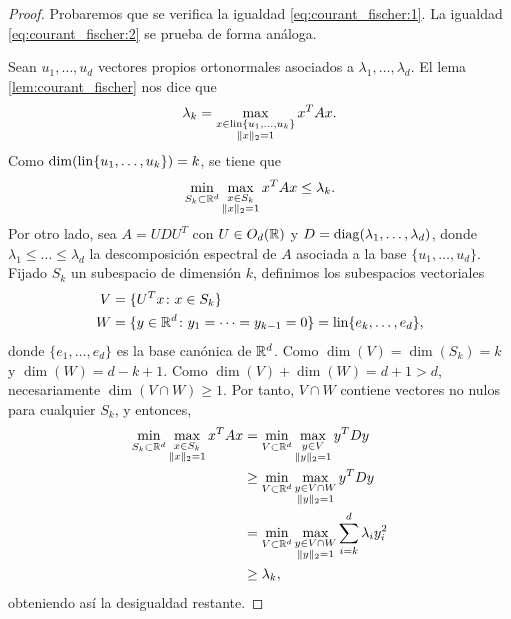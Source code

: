 \begin{proof}
    Probaremos que se verifica la igualdad \ref{eq:courant_fischer:1}. La igualdad \ref{eq:courant_fischer:2} se prueba de forma análoga.

    Sean  $u_1, \dots, u_d$ vectores propios ortonormales asociados a $\lambda_1,\dots,\lambda_d$. El lema \ref{lem:courant_fischer} nos dice que
    \[ \lambda_k = \max_{\substack{x \in \operatorname{lin}\{u_1,\dots,u_k\} \\ \|x\|_2 = 1}} x^TAx. \]
    Como $\dim(\operatorname{lin}\{u_1,\dots,u_k\}) = k$, se tiene que
    \[ \min_{S_k \subset \mathbb{R}^d} \max_{\substack{x \in S_k \\ \|x\|_2 = 1}} x^TAx \le \lambda_k. \]
    Por otro lado, sea $A = UDU^T$ con $U \in O_d(\mathbb{R})$ y $D = \operatorname{diag}(\lambda_1,\dots,\lambda_d)$, donde $\lambda_1 \le \dots \le \lambda_d$ la descomposición espectral de $A$ asociada a la base $\{u_1,\dots,u_d\}$.
    Fijado $S_k$ un subespacio de dimensión $k$, definimos los subespacios vectoriales
    \begin{align*}
        V &= \{ U^Tx \colon x \in S_k \} \\
        W &= \{ y \in \mathbb{R}^d \colon y_1 = \dots = y_{k-1} = 0 \} = \operatorname{lin}\{e_k,\dots,e_d\},
    \end{align*}
    donde $\{e_1,\dots,e_d\}$ es la base canónica de $\mathbb{R}^d$. Como $\dim(V) = \dim(S_k) = k$ y $\dim(W) = d-k+1$. Como $\dim(V) + \dim(W) = d+1 > d$, necesariamente $\dim(V\cap W) \ge 1$. Por tanto, $V \cap W$ contiene vectores no nulos para cualquier $S_k$, y entonces,
    \begin{align*}
         \min_{S_{k} \subset \mathbb{R}^d} \max_{\substack{x \in S_{k} \\ \|x\|_2 = 1}} x^TAx &= \min_{V \subset \mathbb{R}^d} \max_{\substack{y \in V \\ \|y\|_2 = 1}} y^TDy \\
                                                                                      &\ge \min_{V \subset \mathbb{R}^d} \max_{\substack{y \in V\cap W \\ \|y\|_2 = 1}} y^TDy \\
                                                                                      &= \min_{V \subset \mathbb{R}^d} \max_{\substack{y \in V \cap W \\ \|y\|_2 = 1}} \sum_{i=k}^d \lambda_i y_i^2 \\
                                                                                      &\ge \lambda_k,
    \end{align*}
    obteniendo así la desigualdad restante.
\end{proof}

